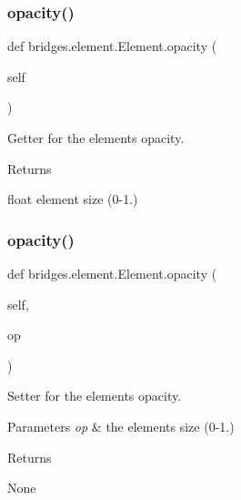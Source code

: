 \subsubsection{\texorpdfstring{opacity()}{opacity()}\hspace{0.1cm}{\footnotesize\ttfamily [1/2]}}
{\footnotesize\ttfamily def bridges.\+element.\+Element.\+opacity (\begin{DoxyParamCaption}\item[{}]{self }\end{DoxyParamCaption})}



Getter for the element\textquotesingle{}s opacity. 

\begin{DoxyReturn}{Returns}


float element size (0-\/1.) 
\end{DoxyReturn}
\mbox{\label{classbridges_1_1element_1_1_element_a1542425770b360b39369e3db7116d6ae}} 
\subsubsection{\texorpdfstring{opacity()}{opacity()}\hspace{0.1cm}{\footnotesize\ttfamily [2/2]}}
{\footnotesize\ttfamily def bridges.\+element.\+Element.\+opacity (\begin{DoxyParamCaption}\item[{}]{self,  }\item[{}]{op }\end{DoxyParamCaption})}



Setter for the element\textquotesingle{}s opacity. 


\begin{DoxyParams}{Parameters}
{\em op} & the element\textquotesingle{}s size (0-\/1.) \\
\hline
\end{DoxyParams}
\begin{DoxyReturn}{Returns}


None 
\end{DoxyReturn}
\mbox{\label{classbridges_1_1element_1_1_element_ad2aff75ace2a306deff639b4aa129ce0}} 
